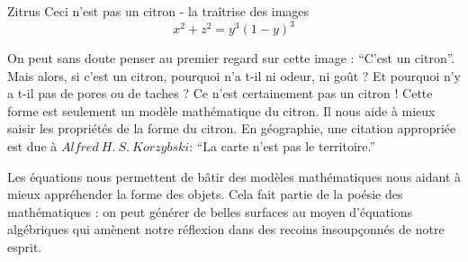 \begin{surferPage}{Zitrus}
Ceci n'est pas un citron - la traîtrise des images\\
\smallskip
\[x^2 + z^2 = y^3 (1 - y)^3\] 


\singlespacing
On peut sans doute penser au premier regard sur cette image : ``C'est un citron''. Mais alors, si c'est un citron, pourquoi n'a t-il ni odeur, ni goût ? Et pourquoi n'y a t-il pas de pores ou de taches ? Ce n'est certainement pas un citron !
\singlespacing
Cette forme est seulement un modèle mathématique du citron. Il nous aide à mieux saisir les propriétés de la forme du citron. En géographie, une citation appropriée est due à $Alfred\ H.\ S.\ Korzybski$: ``La carte n'est pas le territoire.'' \\
\singlespacing

Les équations nous permettent de bâtir des modèles mathématiques nous aidant à mieux appréhender la forme des objets. 
\singlespacing
Cela fait partie de la poésie des mathématiques : on peut générer de belles surfaces au moyen d'équations algébriques qui amènent notre réflexion dans des recoins insoupçonnés de notre esprit.
\end{surferPage}
